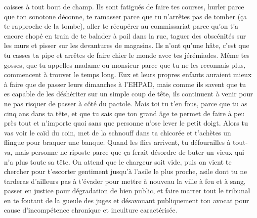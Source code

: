 caisses à tout bout de champ. Ils sont fatigués de faire tes courses, hurler parce que ton sonotone déconne, te ramasser parce que tu n’arrêtes pas de tomber (ça te rapproche de la tombe), aller te récupérer au commissariat parce qu’on t’a encore chopé en train de te balader à poil dans la rue, taguer des obscénités sur les murs et pisser sur les devantures de magasins. Ils n’ont qu’une hâte, c’est que tu casses ta pipe et arrêtes de faire chier le monde avec tes jérémiades. Même tes gosses, que tu appelles madame ou monsieur parce que tu ne les reconnais plus, commencent à trouver le temps long. Eux et leurs propres enfants auraient mieux à faire que de passer leurs dimanches à l’EHPAD, mais comme ils savent que tu es capable de les déshériter sur un simple coup de tête, ils continuent à venir pour ne pas risquer de passer à côté du pactole. Mais toi tu t’en fous, parce que tu as cinq ans dans ta tête, et que tu sais que ton grand âge te permet de faire à peu près tout et n’importe quoi sans que personne n’ose lever le petit doigt. Alors tu vas voir le caïd du coin, met de la schnouff dans ta chicorée et t’achètes un flingue pour braquer une banque. Quand les flics arrivent, tu défourailles à tout-va, mais personne ne riposte parce que ça ferait désordre de buter un vieux qui n’a plus toute sa tête. On attend que le chargeur soit vide, puis on vient te chercher pour t’escorter gentiment jusqu’à l’asile le plus proche, asile dont tu ne tarderas d’ailleurs pas à t’évader pour mettre à nouveau la ville à feu et à sang, passer en justice pour dégradation de bien public, et faire marrer tout le tribunal en te foutant de la gueule des juges et désavouant publiquement ton avocat pour cause d’incompétence chronique et inculture caractérisée.

